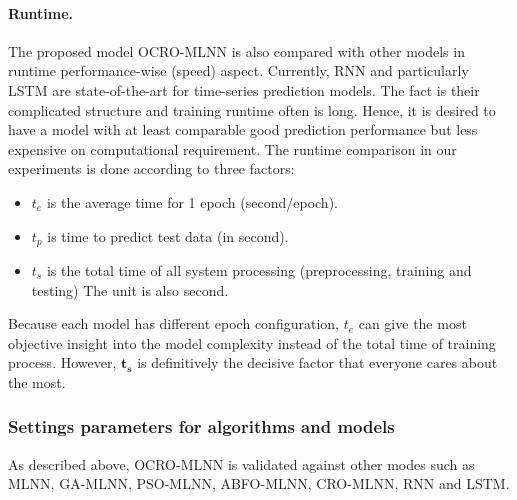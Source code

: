\documentclass[smallcondensed, natbib]{svjour3}     %
\def \GN#1{\textcolor{tn_orange}{~#1}}			%
\begin{document}
\paragraph{\textbf{Runtime.}} The proposed model OCRO-MLNN is also compared with other models in runtime performance-wise (speed) aspect. Currently, RNN and particularly LSTM are state-of-the-art for time-series prediction models. The fact is their complicated structure 
and training runtime often is long. Hence, it is desired to have a model with at least comparable good prediction performance but less expensive on computational requirement. 
The runtime comparison in our experiments is done according to three factors: 

\begin{itemize}
	\item $t_e$ is the average time for 1 epoch (second/epoch).
	\item $t_p$ is time to predict test data (in second). 
	\item $t_s$ is the total time of all system processing (preprocessing, training and testing) The unit is also second. 
\end {itemize}

Because each model has different epoch configuration, $t_e$ can give the most objective insight into the model complexity instead of the total time of training process. However, $\boldsymbol{t_s}$ is definitively the decisive factor that everyone cares about the most. 

\subsubsection{Settings parameters for algorithms and models}
\label{para_settings}

As described above, OCRO-MLNN is validated against other modes such as MLNN, GA-MLNN, PSO-MLNN, ABFO-MLNN, CRO-MLNN, RNN and LSTM. 
\end{document}
